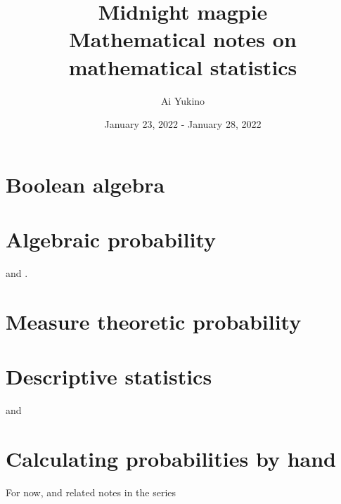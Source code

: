 \documentclass{article}
\begin{document}
\title{Midnight magpie \\
	\large Mathematical notes on mathematical statistics}
\author{Ai Yukino}
\date{January 23, 2022 - January 28, 2022}
\maketitle
\hypersetup{linkcolor = internallinkcolor}
\tableofcontents
\hypersetup{linkcolor= .}

\section{Boolean algebra}

\section{Algebraic probability}

\cite{tao2015} and \cite{tao2009}.

\section{Measure theoretic probability}

\cite{tao2015}

\section{Descriptive statistics}

\cite{siegrist2021} and \cite{HoggMcKeanCraig2019}

\section{Calculating probabilities by hand}

For now, \cite{tao2015} and related notes in the series




\end{document}
